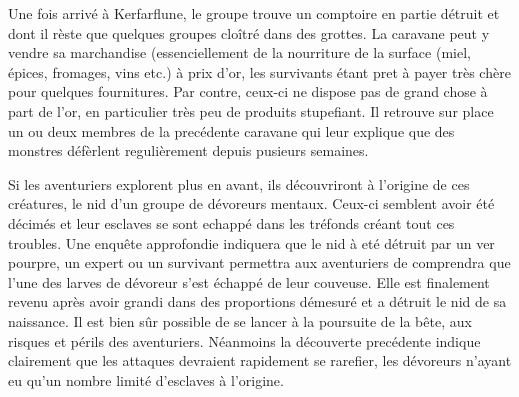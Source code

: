 Une fois arrivé à Kerfarflune, le groupe trouve un comptoire en partie détruit 
et dont il rèste que quelques groupes cloîtré dans des grottes. La caravane
peut y vendre sa marchandise (essenciellement de la nourriture de la surface
(miel, épices, fromages, vins etc.) à prix d'or, les survivants étant pret 
à payer très chère pour quelques fournitures. Par contre, ceux-ci ne dispose 
pas de grand chose à part de l'or, en particulier très peu de produits 
stupefiant. Il retrouve sur place un ou deux membres de la precédente 
caravane qui leur explique que des monstres défèrlent regulièrement depuis
pusieurs semaines.

Si les aventuriers explorent plus en avant, ils découvriront à l'origine 
de ces créatures, le nid d'un groupe de dévoreurs mentaux. Ceux-ci semblent 
avoir été décimés et leur esclaves se sont echappé dans les tréfonds créant 
tout ces troubles. Une enquête approfondie indiquera que le nid à eté détruit
par un ver pourpre, un expert ou un survivant permettra aux aventuriers de
comprendra que l'une des larves de dévoreur s'est échappé de leur couveuse.
Elle est finalement revenu après avoir grandi dans des proportions démesuré
et a détruit le nid de sa naissance. Il est bien sûr possible de se lancer 
à la poursuite de la bête, aux risques et périls des aventuriers. Néanmoins 
la découverte precédente indique clairement que les attaques devraient 
rapidement se rarefier, les dévoreurs n'ayant eu qu'un nombre limité 
d'esclaves à l'origine. 

